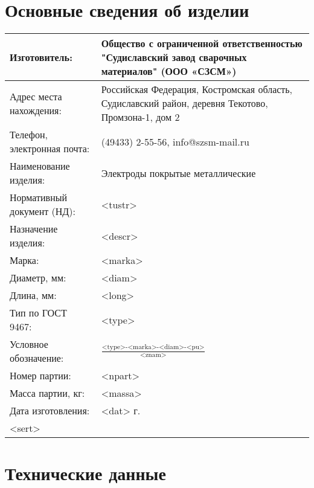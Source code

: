 \documentclass[russian,utf8,pointsection,nocolumnxxxi,nocolumnxxxii,12pt]{eskdtext}
\begin{document}
\maketitle

\tableofcontents
\pagebreak[4]

\section{ Основные сведения об изделии }

\begin{tabular}{|p{5cm}|p{10cm}|}
\hline 
Изготовитель: & Общество с ограниченной ответственностью "Судиславский завод сварочных материалов" (ООО «СЗСМ»)  \\
\hline 
Адрес места нахождения: & Российская Федерация, Костромская область, Судиславский район, деревня Текотово, Промзона-1, дом 2  \\
\hline 
Телефон, электронная почта: & (49433) 2-55-56, info@szsm-mail.ru \\
\hline 
Наименование изделия: & Электроды покрытые металлические \\
\hline 
Нормативный документ (НД): & <tustr> \\
\hline 
Назначение изделия:  & <descr> \\
\hline 
Марка: & <marka> \\
\hline 
Диаметр, мм: & <diam> \\
\hline 
Длина, мм: & <long> \\
\hline 
Тип по ГОСТ 9467: & <type> \\
\hline 
Условное обозначение: & \vspace{-2.5mm}  $ \frac {\text{<type>-<marka>-<diam>-<pu>}}{\text{<znam>}} $ \vspace{2.5mm}\\
\hline 
Номер партии: & <npart> \\
\hline 
Масса партии, кг: & <massa> \\
\hline 
Дата изготовления: & <dat> г. \\
\hline 
<sert>
\end{tabular}

\section{Технические данные}
\end{document}
